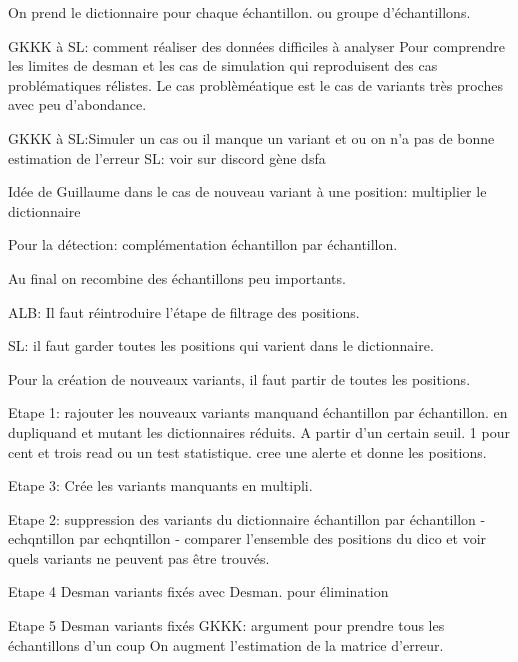 \documentclass{article}
\begin{document}
On prend le dictionnaire pour chaque échantillon.
ou groupe d'échantillons.

GKKK à SL: comment réaliser des données difficiles à analyser Pour comprendre les limites de desman et les cas de simulation qui reproduisent des cas problématiques rélistes. 
Le cas problèméatique est le cas de variants très proches avec peu d'abondance.

GKKK à SL:Simuler un cas ou il manque un variant et ou on n'a pas de bonne estimation de l'erreur
SL: voir sur discord gène dsfa

Idée de Guillaume dans le cas de nouveau variant à une position:
multiplier  le dictionnaire 

Pour la détection:
complémentation échantillon par échantillon.

Au final on recombine des échantillons peu importants.

ALB: Il faut réintroduire l'étape de filtrage des positions.

SL: il faut garder toutes les positions qui varient dans le dictionnaire.

Pour la création de nouveaux variants, il faut partir de toutes les positions.

Etape 1: rajouter les nouveaux variants manquand échantillon par échantillon. en dupliquand et mutant les dictionnaires réduits.
A partir d'un certain seuil. 
1 pour cent et trois read
ou un test statistique.
cree une alerte et donne les positions.

Etape 3: Crée les variants manquants en multipli.

Etape 2: suppression des variants du dictionnaire échantillon par échantillon
 - echqntillon par echqntillon
- comparer l'ensemble des positions du dico et voir quels variants ne peuvent pas être trouvés.

Etape 4 Desman variants fixés avec Desman. pour élimination

Etape 5 Desman variants fixés 
GKKK: argument pour prendre tous les échantillons d'un coup
On augment l'estimation de la matrice d'erreur.
\end{document}

